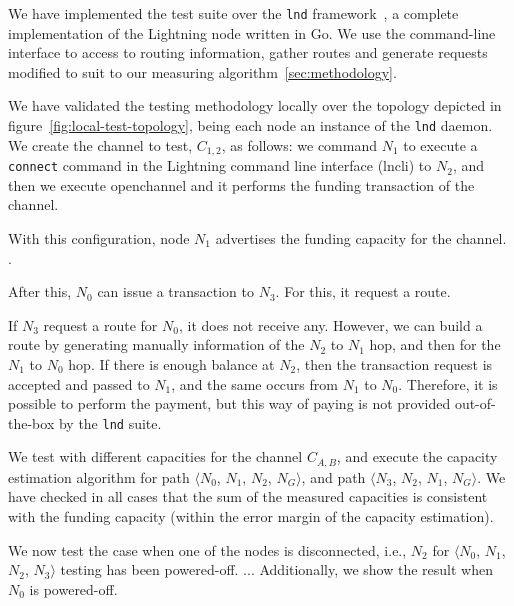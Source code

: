 We have implemented the test suite over the \texttt{lnd} framework~\cite{lndDaemon}, 
a complete implementation of the Lightning node written in Go.
We use the command-line interface to access to routing information, 
gather routes and generate requests modified to suit to our measuring algorithm~\ref{sec:methodology}.

We have validated the testing methodology locally over the topology depicted in figure~\ref{fig:local-test-topology}, 
being each node an instance of the \texttt{lnd} daemon.
We create the channel to test, $C_{1,2}$, as follows: 
we command $N_1$ to execute a \texttt{connect} command in the Lightning command line interface 
(lncli) to $N_2$, and then we execute openchannel 
and it performs the funding transaction of the channel.

With this configuration, node $N_1$ advertises the funding capacity for the channel.
.

After this, $N_0$ can issue a transaction to $N_3$.
For this, it request a route. 

If $N_3$ request a route for $N_0$, it does not receive any. However, we can build a route by generating manually information of the $N_2$ to $N_1$ hop, and then for the $N_1$ to $N_0$ hop.
If there is enough balance at $N_2$, then the transaction request is accepted and passed to $N_1$, and the same occurs from $N_1$ to $N_0$. Therefore, it is possible to perform the payment, but 
this way of paying is not provided out-of-the-box by the \texttt{lnd} suite.

We test with different capacities for the channel $C_{A,B}$, and execute the capacity estimation algorithm for path 
$\langle N_0$, $N_1$, $N_2$, $N_G \rangle$, and  path $\langle N_3$, $N_2$, $N_1$, $N_G \rangle$. 
We have checked in all cases that the sum of the measured capacities 
is consistent with the funding capacity (within the error margin of the capacity estimation).

We now test the case when one of the nodes is disconnected, i.e., $N_2$ for $\langle N_0$, $N_1$, $N_2$, $N_3 \rangle$ testing has been powered-off. 
...
Additionally, we show the result when $N_0$ is powered-off.

